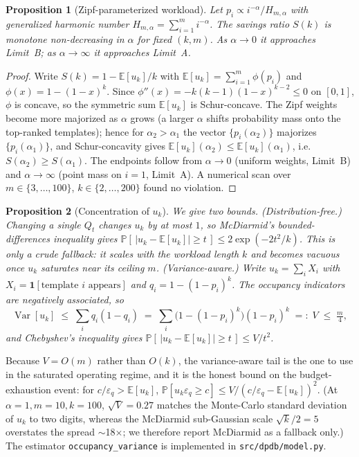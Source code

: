 \documentclass[sigconf,nonacm]{acmart}
\newcommand{\eps}{\varepsilon}
\newcommand{\E}{\mathbb{E}}
\newcommand{\Prob}{\mathbb{P}}
\DeclareMathOperator{\Var}{Var}
\newtheorem{prop}{Proposition}
\begin{document}
\begin{prop}[Zipf-parameterized workload]
\label{prop:zipf}
Let $p_i \propto i^{-\alpha}/H_{m,\alpha}$ with generalized harmonic number $H_{m,\alpha} = \sum_{i=1}^m i^{-\alpha}$. The savings ratio $S(k)$ is monotone non-decreasing in $\alpha$ for fixed $(k,m)$. As $\alpha \to 0$ it approaches Limit~B; as $\alpha \to \infty$ it approaches Limit~A.
\end{prop}
\begin{proof}
Write $S(k)=1-\E[u_k]/k$ with $\E[u_k]=\sum_{i=1}^m \phi(p_i)$ and $\phi(x)=1-(1-x)^k$. Since $\phi''(x)=-k(k-1)(1-x)^{k-2}\le 0$ on $[0,1]$, $\phi$ is concave, so the symmetric sum $\E[u_k]$ is Schur-concave. The Zipf weights become more majorized as $\alpha$ grows (a larger $\alpha$ shifts probability mass onto the top-ranked templates); hence for $\alpha_2>\alpha_1$ the vector $\{p_i(\alpha_2)\}$ majorizes $\{p_i(\alpha_1)\}$, and Schur-concavity gives $\E[u_k](\alpha_2)\le\E[u_k](\alpha_1)$, i.e.\ $S(\alpha_2)\ge S(\alpha_1)$. The endpoints follow from $\alpha\to 0$ (uniform weights, Limit~B) and $\alpha\to\infty$ (point mass on $i=1$, Limit~A). A numerical scan over $m\in\{3,\dots,100\}$, $k\in\{2,\dots,200\}$ found no violation.
\end{proof}

\begin{prop}[Concentration of $u_k$]
\label{prop:concentration}
We give two bounds. \emph{(Distribution-free.)} Changing a single $Q_t$ changes $u_k$ by at most $1$, so McDiarmid's bounded-differences inequality gives $\Prob[\,|u_k-\E[u_k]|\ge t\,]\le 2\exp(-2t^2/k)$. This is only a crude fallback: it scales with the workload length $k$ and becomes vacuous once $u_k$ saturates near its ceiling $m$. \emph{(Variance-aware.)} Write $u_k=\sum_i X_i$ with $X_i=\mathbf 1[\text{template }i\text{ appears}]$ and $q_i=1-(1-p_i)^k$. The occupancy indicators are negatively associated, so
\[
\Var[u_k] \;\le\; \sum_i q_i(1-q_i) \;=\; \sum_i \bigl(1-(1-p_i)^k\bigr)(1-p_i)^k \;=:\; V \;\le\; \tfrac{m}{4},
\]
and Chebyshev's inequality gives $\Prob[\,|u_k-\E[u_k]|\ge t\,]\le V/t^2$.
\end{prop}

\noindent Because $V=O(m)$ rather than $O(k)$, the variance-aware tail is the one to use in the saturated operating regime, and it is the honest bound on the budget-exhaustion event: for $c/\eps_q>\E[u_k]$, $\Prob[u_k\eps_q\ge c]\le V/(c/\eps_q-\E[u_k])^2$. (At $\alpha{=}1,m{=}10,k{=}100$, $\sqrt V=0.27$ matches the Monte-Carlo standard deviation of $u_k$ to two digits, whereas the McDiarmid sub-Gaussian scale $\sqrt{k}/2=5$ overstates the spread $\sim$18$\times$; we therefore report McDiarmid as a fallback only.) The estimator \texttt{occupancy\_variance} is implemented in \texttt{src/dpdb/model.py}.
\end{document}
